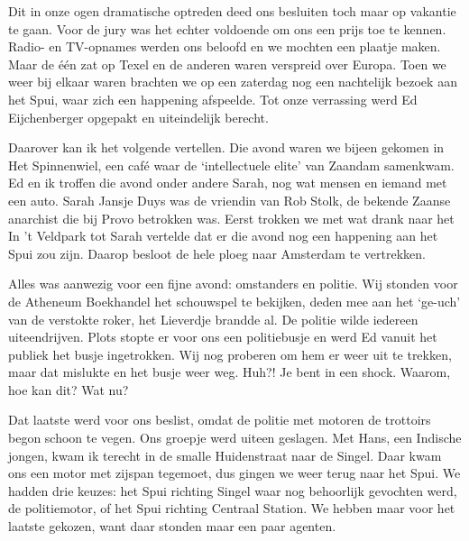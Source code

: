 \documentclass[12pt,twoside, openright]{memoir}
\begin{document}
Dit in onze ogen dramatische optreden deed ons besluiten toch maar op vakantie te gaan. Voor de jury was het echter voldoende om ons een prijs toe te kennen. Radio- en TV-opnames werden ons beloofd en we mochten een plaatje maken. Maar de één zat op Texel en de anderen waren verspreid over Europa. Toen we weer bij elkaar waren brachten we op een zaterdag nog een nachtelijk bezoek aan het Spui, waar zich een happening afspeelde. Tot onze verrassing werd Ed Eijchenberger opgepakt en uiteindelijk berecht.

Daarover kan ik het volgende vertellen. Die avond waren we bijeen gekomen in Het Spinnenwiel, een café waar de `intellectuele elite' van Zaandam samenkwam. Ed en ik troffen die avond onder andere Sarah, nog wat mensen en iemand met een auto. Sarah Jansje Duys was de vriendin van Rob Stolk, de bekende Zaanse anarchist die bij Provo betrokken was. Eerst trokken we met wat drank naar het In ’t Veldpark tot Sarah vertelde dat er die avond nog een happening aan het Spui zou zijn. Daarop besloot de hele ploeg naar Amsterdam te vertrekken. 

Alles was aanwezig voor een fijne avond: omstanders en politie. Wij stonden voor de Atheneum Boekhandel het schouwspel te bekijken, deden mee aan het ‘ge-uch’ van de verstokte roker, het Lieverdje brandde al. De politie wilde iedereen uiteendrijven. Plots stopte er voor ons een politiebusje en werd Ed vanuit het publiek het busje ingetrokken. Wij nog proberen om hem er weer uit te trekken, maar dat mislukte en het busje weer weg. Huh?! Je bent in een shock. Waarom, hoe kan dit? Wat nu? 

Dat laatste werd voor ons beslist, omdat de politie met motoren de trottoirs begon schoon te vegen. Ons groepje werd uiteen geslagen. Met Hans, een Indische jongen, kwam ik terecht in de smalle Huidenstraat naar de Singel. Daar kwam ons een motor met zijspan tegemoet, dus gingen we weer terug naar het Spui. We hadden drie keuzes: het Spui richting Singel waar nog behoorlijk gevochten werd, de politiemotor, of het Spui richting Centraal Station. We hebben maar voor het laatste gekozen, want daar stonden maar een paar agenten. 
\end{document}
